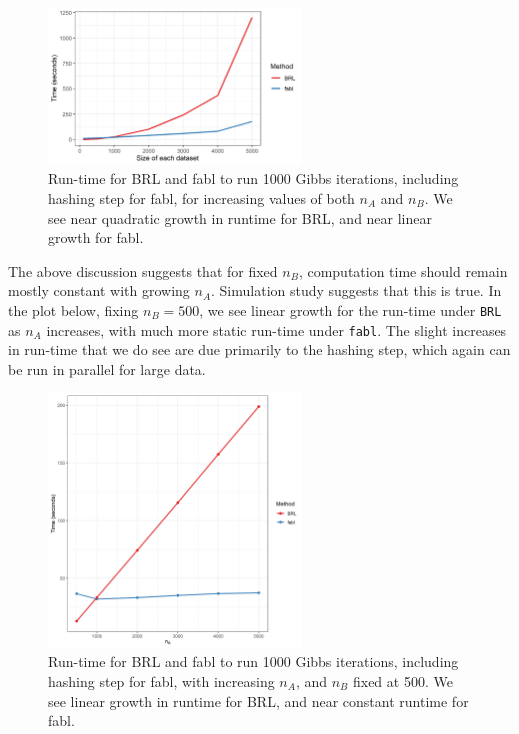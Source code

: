 \documentclass[12pt,letterpaper]{article}
\newcommand{\1}[1]{\mathbb{I}\!\left[#1\right]} %
\begin{document}
\begin{figure}[ht]
	
	{\centering \includegraphics[width=0.6\textwidth]{../notes/figures/sadinle_speed_plot2} 
		
	}
	
	\caption{Run-time for BRL and fabl to run 1000 Gibbs iterations, including hashing step for fabl, for increasing values of both $n_A$ and $n_B$. We see near quadratic growth in runtime for BRL, and near linear growth for fabl.}\label{fig:speed1}
\end{figure}

The above discussion suggests that for fixed \(n_B\), computation time
should remain mostly constant with growing \(n_A\). Simulation study
suggests that this is true. In the plot below, fixing \(n_B = 500\), we
see linear growth for the run-time under \texttt{BRL} as \(n_A\)
increases, with much more static run-time under \texttt{fabl}. The
slight increases in run-time that we do see are due primarily to the
hashing step, which again can be run in parallel for large data.

\begin{figure}[t]
	
	{\centering \includegraphics[width=0.6\textwidth]{../notes/figures/speed_plot_fixed_nB} 
		
	}
	
	\caption{Run-time for BRL and fabl to run 1000 Gibbs iterations, including hashing step for fabl, with increasing $n_A$, and $n_B$ fixed at 500. We see linear growth in runtime for BRL, and near constant runtime for fabl.}\label{fig:speed2}
\end{figure}
\end{document}

